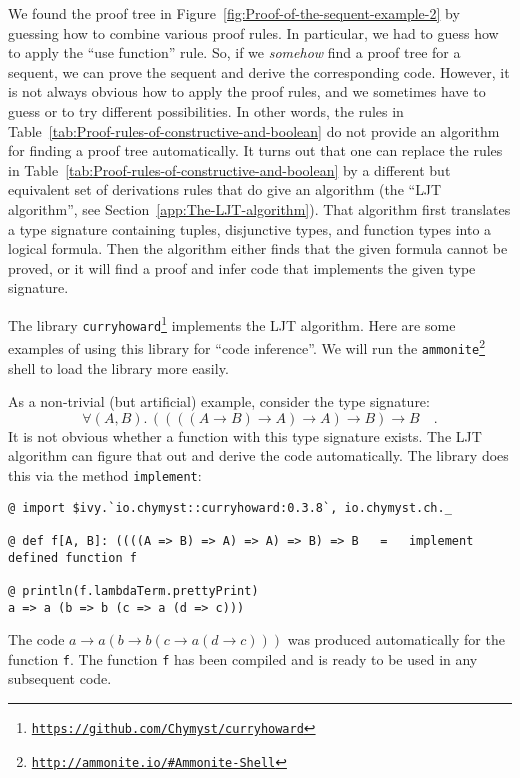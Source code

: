 We found the proof tree in Figure~\ref{fig:Proof-of-the-sequent-example-2}
by guessing how to combine various proof rules. In particular, we
had to guess how to apply the \textsf{``}use function\textsf{''} rule. So, if we \emph{somehow}
find a proof tree for a sequent, we can prove the sequent and derive
the corresponding code. However, it is not always obvious how to apply
the proof rules, and we sometimes have to guess or to try different
possibilities. In other words, the rules in Table~\ref{tab:Proof-rules-of-constructive-and-boolean}
do not provide an algorithm for finding a proof tree automatically.
It turns out that one can replace the rules in Table~\ref{tab:Proof-rules-of-constructive-and-boolean}
by a different but equivalent set of derivations rules that do give
an algorithm (the \textsf{``}LJT algorithm\textsf{''}, see Section~\ref{app:The-LJT-algorithm}).
That algorithm first translates a type signature containing tuples,
disjunctive types, and function types into a logical formula. Then
the algorithm either finds that the given formula cannot be proved,
or it will find a proof and infer code that implements the given type
signature.

The library \texttt{curryhoward}\footnote{\texttt{\href{https://github.com/Chymyst/curryhoward}{https://github.com/Chymyst/curryhoward}}}
implements the LJT algorithm. Here are some examples of using this
library for \textsf{``}code inference\textsf{''}. We will run
the \texttt{ammonite}\footnote{\texttt{\href{http://ammonite.io/\#Ammonite-Shell}{http://ammonite.io/\#Ammonite-Shell}}}
shell to load the library more easily.

As a non-trivial (but artificial) example, consider the type signature:
\[
\forall(A,B).\,\left(\left(\left(\left(A\rightarrow B\right)\rightarrow A\right)\rightarrow A\right)\rightarrow B\right)\rightarrow B\quad.
\]
It is not obvious whether a function with this type signature exists.
The LJT algorithm can figure that out and derive the code automatically.
The library does this via the method \lstinline!implement!:
\begin{lstlisting}
@ import $ivy.`io.chymyst::curryhoward:0.3.8`, io.chymyst.ch._

@ def f[A, B]: ((((A => B) => A) => A) => B) => B   =   implement
defined function f

@ println(f.lambdaTerm.prettyPrint)
a => a (b => b (c => a (d => c)))
\end{lstlisting}
The code $a\rightarrow a\left(b\rightarrow b\left(c\rightarrow a\left(d\rightarrow c\right)\right)\right)$
was produced automatically for the function \lstinline!f!. The function
\lstinline!f! has been compiled and is ready to be used in any subsequent
code.

